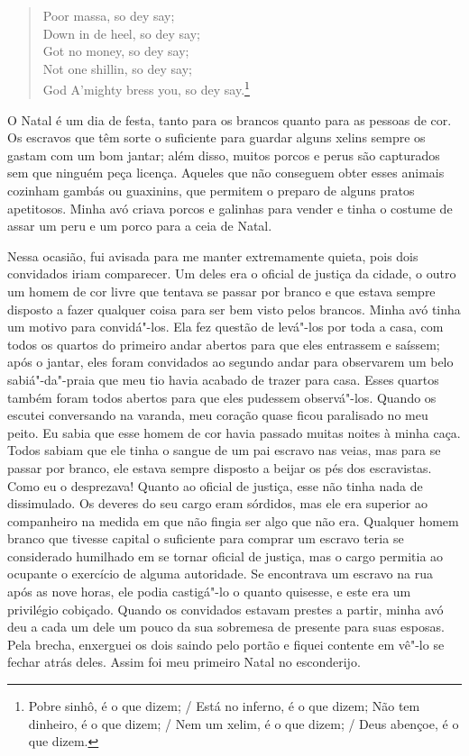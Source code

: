 \begin{verse}
Poor massa, so dey say;\\
Down in de heel, so dey say;\\
Got no money, so dey say;\\
Not one shillin, so dey say;\\
God A'mighty bress you, so dey say.\footnote{Pobre sinhô, é o que dizem; / Está no inferno, é o que dizem;
Não tem dinheiro, é o que dizem; / Nem um xelim, é o que dizem; / Deus
abençoe, é o que dizem.}
\end{verse}

O Natal é um dia de festa, tanto para
os brancos quanto para as pessoas de cor. Os escravos que têm sorte o
suficiente para guardar alguns xelins sempre os gastam com um bom
jantar; além disso, muitos porcos e perus são capturados sem que ninguém
peça licença. Aqueles que não conseguem obter esses animais cozinham
gambás ou guaxinins, que permitem o preparo de alguns pratos apetitosos.
Minha avó criava porcos e galinhas para vender e tinha o costume de
assar um peru e um porco para a ceia de Natal.

Nessa ocasião, fui avisada para me
manter extremamente quieta, pois dois convidados iriam comparecer. Um
deles era o oficial de justiça da cidade, o outro um homem de cor livre
que tentava se passar por branco e que estava sempre disposto a fazer
qualquer coisa para ser bem visto pelos brancos. Minha avó tinha um
motivo para convidá"-los. Ela fez questão de levá"-los por toda a casa,
com todos os quartos do primeiro andar abertos para que eles entrassem e
saíssem; após o jantar, eles foram convidados ao segundo andar para
observarem um belo sabiá"-da"-praia que meu tio havia acabado de trazer
para casa. Esses quartos também foram todos abertos para que eles
pudessem observá"-los. Quando os escutei conversando na varanda, meu
coração quase ficou paralisado no meu peito. Eu sabia que esse homem de
cor havia passado muitas noites à minha caça. Todos sabiam que ele tinha
o sangue de um pai escravo nas veias, mas para se passar por branco, ele
estava sempre disposto a beijar os pés dos escravistas. Como eu o
desprezava! Quanto ao oficial de justiça, esse não tinha nada de
dissimulado. Os deveres do seu cargo eram sórdidos, mas ele era superior
ao companheiro na medida em que não fingia ser algo que não era.
Qualquer homem branco que tivesse capital o suficiente para comprar um
escravo teria se considerado humilhado em se tornar oficial de justiça,
mas o cargo permitia ao ocupante o exercício de alguma autoridade. Se
encontrava um escravo na rua após as nove horas, ele podia castigá"-lo o
quanto quisesse, e este era um privilégio cobiçado. Quando os convidados
estavam prestes a partir, minha avó deu a cada um dele um pouco da sua
sobremesa de presente para suas esposas. Pela brecha, enxerguei os dois
saindo pelo portão e fiquei contente em vê"-lo se fechar atrás deles.
Assim foi meu primeiro Natal no esconderijo.

